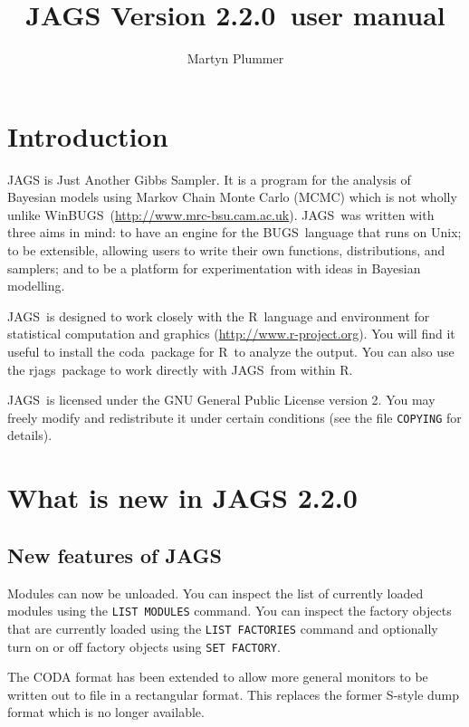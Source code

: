 \documentclass[11pt, a4paper, titlepage]{report}
\newcommand{\release}{2.2.0}
\newcommand{\JAGS}{\textsf{JAGS}}
\newcommand{\rjags}{\textsf{rjags}}
\newcommand{\BUGS}{\textsf{BUGS}}
\newcommand{\WinBUGS}{\textsf{WinBUGS}}
\newcommand{\R}{\textsf{R}}
\newcommand{\CODA}{\textsf{coda}}
\begin{document}
\title{JAGS Version \release\ user manual}
\author{Martyn Plummer}
\maketitle

\tableofcontents

\chapter{Introduction}

JAGS is Just Another Gibbs Sampler.  It is a program for the analysis
of Bayesian models using Markov Chain Monte Carlo (MCMC) which is not
wholly unlike
\WinBUGS\ (\url{http://www.mrc-bsu.cam.ac.uk}). \JAGS\ was written
with three aims in mind: to have an engine for the \BUGS\ language
that runs on Unix; to be extensible, allowing users to write their own
functions, distributions, and samplers; and to be a platform for
experimentation with ideas in Bayesian modelling.

\JAGS\ is designed to work closely with the \R\ language and
environment for statistical computation and graphics
(\url{http://www.r-project.org}).  You will find it useful to install
the \CODA\ package for \R\ to analyze the output. You can also use the
\rjags\ package to work directly with \JAGS\ from within R.

\JAGS\ is licensed under the GNU General Public License
version 2. You may freely modify and redistribute it under certain
conditions (see the file \texttt{COPYING} for details).

\chapter{What is new in JAGS \release}

\section{New features of JAGS}

Modules can now be unloaded. You can inspect the list of currently
loaded modules using the \verb+LIST MODULES+ command. You can inspect
the factory objects that are currently loaded using the
\verb+LIST FACTORIES+ command and optionally turn on or off factory
objects using \verb+SET FACTORY+.

The CODA format has been extended to allow more general monitors
to be written out to file in a rectangular format.  This replaces
the former S-style dump format which is no longer available.
\end{document}
